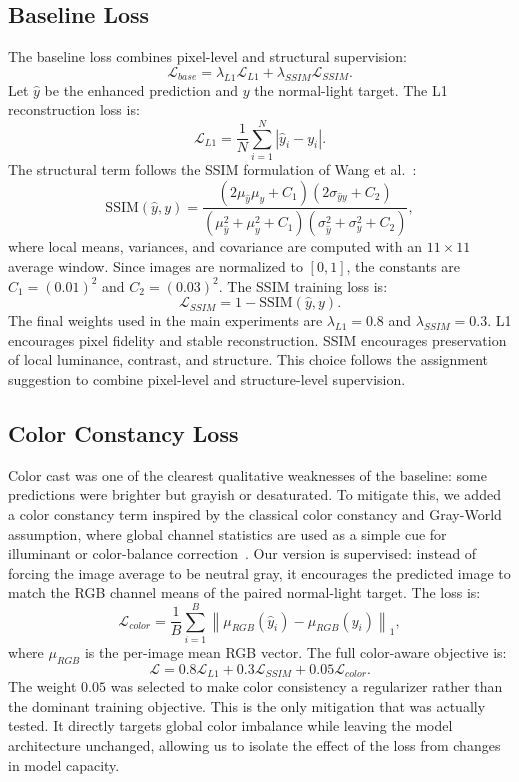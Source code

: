 \documentclass[10pt,twocolumn]{article}
\begin{document}
\subsection{Baseline Loss}
The baseline loss combines pixel-level and structural supervision:
\[
\mathcal{L}_{base} =
\lambda_{L1}\mathcal{L}_{L1} +
\lambda_{SSIM}\mathcal{L}_{SSIM}.
\]
Let $\hat{y}$ be the enhanced prediction and $y$ the normal-light target. The L1 reconstruction loss is:
\[
\mathcal{L}_{L1} =
\frac{1}{N}\sum_{i=1}^{N}
\left|\hat{y}_i-y_i\right|.
\]
The structural term follows the SSIM formulation of Wang et al.~\cite{wang2004ssim}:
\[
\mathrm{SSIM}(\hat{y},y)=
\frac{
(2\mu_{\hat{y}}\mu_y+C_1)(2\sigma_{\hat{y}y}+C_2)
}{
(\mu_{\hat{y}}^2+\mu_y^2+C_1)(\sigma_{\hat{y}}^2+\sigma_y^2+C_2)
},
\]
where local means, variances, and covariance are computed with an $11 \times 11$ average window. Since images are normalized to $[0,1]$, the constants are $C_1=(0.01)^2$ and $C_2=(0.03)^2$. The SSIM training loss is:
\[
\mathcal{L}_{SSIM}=1-\mathrm{SSIM}(\hat{y},y).
\]
The final weights used in the main experiments are $\lambda_{L1}=0.8$ and $\lambda_{SSIM}=0.3$. L1 encourages pixel fidelity and stable reconstruction. SSIM encourages preservation of local luminance, contrast, and structure. This choice follows the assignment suggestion to combine pixel-level and structure-level supervision.

\subsection{Color Constancy Loss}
Color cast was one of the clearest qualitative weaknesses of the baseline: some predictions were brighter but grayish or desaturated. To mitigate this, we added a color constancy term inspired by the classical color constancy and Gray-World assumption, where global channel statistics are used as a simple cue for illuminant or color-balance correction~\cite{buchsbaum1980grayworld}. Our version is supervised: instead of forcing the image average to be neutral gray, it encourages the predicted image to match the RGB channel means of the paired normal-light target. The loss is:
\[
\mathcal{L}_{color} =
\frac{1}{B}\sum_{i=1}^{B}
\left\|
\mu_{RGB}(\hat{y}_i) - \mu_{RGB}(y_i)
\right\|_1,
\]
where $\mu_{RGB}$ is the per-image mean RGB vector. The full color-aware objective is:
\[
\mathcal{L} =
0.8\mathcal{L}_{L1}
+0.3\mathcal{L}_{SSIM}
+0.05\mathcal{L}_{color}.
\]
The weight $0.05$ was selected to make color consistency a regularizer rather than the dominant training objective. This is the only mitigation that was actually tested. It directly targets global color imbalance while leaving the model architecture unchanged, allowing us to isolate the effect of the loss from changes in model capacity.
\end{document}
